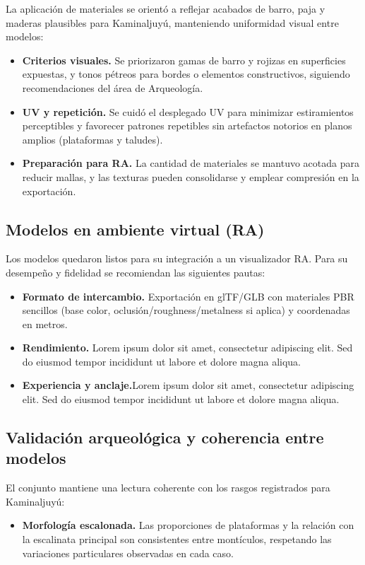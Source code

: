 La aplicación de materiales se orientó a reflejar acabados de barro, paja y maderas plausibles para Kaminaljuyú, manteniendo uniformidad visual entre modelos:
\begin{itemize}
    \item \textbf{Criterios visuales.} Se priorizaron gamas de barro y rojizas en superficies expuestas, y tonos pétreos para bordes o elementos constructivos, siguiendo recomendaciones del área de Arqueología.
    \item \textbf{UV y repetición.} Se cuidó el desplegado UV para minimizar estiramientos perceptibles y favorecer patrones repetibles sin artefactos notorios en planos amplios (plataformas y taludes).
    \item \textbf{Preparación para RA.} La cantidad de materiales se mantuvo acotada para reducir mallas, y las texturas pueden consolidarse y emplear compresión en la exportación.
\end{itemize}

\subsection{Modelos en ambiente virtual (RA)}

Los modelos quedaron listos para su integración a un visualizador RA. Para su desempeño y fidelidad se recomiendan las siguientes pautas:
\begin{itemize}
    \item \textbf{Formato de intercambio.} Exportación en glTF/GLB con materiales PBR sencillos (base color, oclusión/roughness/metalness si aplica) y coordenadas en metros.
    \item \textbf{Rendimiento.} Lorem ipsum dolor sit amet, consectetur adipiscing elit. Sed do eiusmod tempor incididunt ut labore et dolore magna aliqua.
    \item \textbf{Experiencia y anclaje.}Lorem ipsum dolor sit amet, consectetur adipiscing elit. Sed do eiusmod tempor incididunt ut labore et dolore magna aliqua.
\end{itemize}

\subsection{Validación arqueológica y coherencia entre modelos}

El conjunto mantiene una lectura coherente con los rasgos registrados para Kaminaljuyú:
\begin{itemize}
    \item \textbf{Morfología escalonada.} Las proporciones de plataformas y la relación con la escalinata principal son consistentes entre montículos, respetando las variaciones particulares observadas en cada caso.
\end{itemize}

